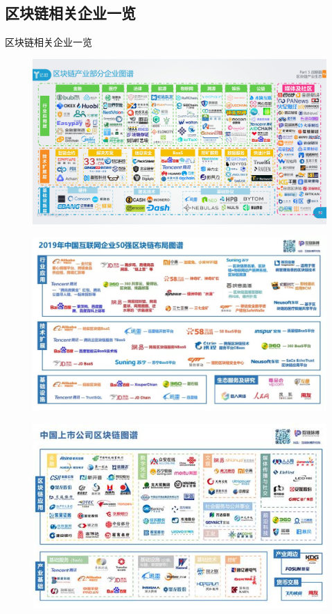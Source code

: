 \documentclass[11pt]{beamer}
\begin{document}
\subsection{区块链相关企业一览}

\begin{frame}[allowframebreaks]{区块链相关企业一览}
	\begin{figure}
		\centering
		\includegraphics[width=0.9\linewidth]{figures/chinablockchaincompany}
		\label{fig:chinablockchaincompany}
	\end{figure}
	\begin{figure}
		\centering
		\includegraphics[width=0.9\linewidth]{figures/chinabigcompnayinblockchain}
		\label{fig:blockchainconpanyinchina}
	\end{figure}
	\begin{figure}
		\centering
		\includegraphics[width=0.9\linewidth]{figures/bigcompany2}
		\label{fig:bigcompany2}
	\end{figure}

\end{frame}
\end{document}
